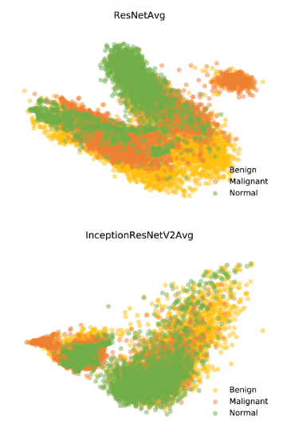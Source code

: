\begin{figure}[H]
\begin{subfigure}{.2\textwidth}
      \includegraphics[width=\textwidth]{contents/chapter_4/resources/visualisation_transfer_resnetavg.png}
    \end{subfigure}
    \begin{subfigure}{.2\textwidth}
      \includegraphics[width=\textwidth]{contents/chapter_4/resources/visualisation_transfer_inceptionresnetv2avg.png}
    \end{subfigure}
    

\end{figure}
